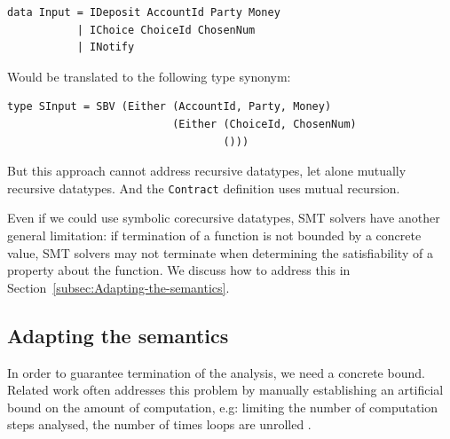 \documentclass[english,runningheads]{llncs}
\begin{document}
\begin{verbatim}
data Input = IDeposit AccountId Party Money
           | IChoice ChoiceId ChosenNum
           | INotify
\end{verbatim}

Would be translated to the following type synonym:

\begin{verbatim}
type SInput = SBV (Either (AccountId, Party, Money)
                          (Either (ChoiceId, ChosenNum)
                                  ()))
\end{verbatim}

But this approach cannot address recursive datatypes, let alone mutually
recursive datatypes. And the \texttt{Contract} definition uses mutual recursion.

Even if we could use symbolic corecursive datatypes, SMT solvers have another
general limitation: if termination of a function is not bounded
by a concrete value, SMT solvers may not terminate when determining
the satisfiability of a property about the function.
We discuss how to address this in Section~\ref{subsec:Adapting-the-semantics}.

\subsection{Adapting the semantics\label{subsec:Adapting-the-semantics}}

In order to guarantee termination of the analysis, we need a
concrete bound. Related work often addresses this problem by
manually establishing an artificial bound on the amount of computation,
e.g: limiting the number of computation steps analysed,
the number of times loops are unrolled \cite{clarke2004tool,gulwani2008program,jackson2000finding}.
\end{document}
